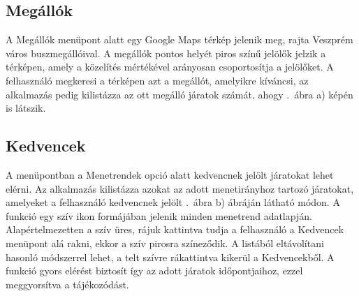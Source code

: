\subsection {Megállók}
\label {megallok}
A Megállók menüpont alatt egy Google Maps térkép jelenik meg, rajta Veszprém város buszmegállóival.
A megállók pontos helyét piros színű jelölők jelzik a térképen, amely a közelítés mértékével arányosan csoportosítja a jelölőket.
A felhasználó megkeresi a térképen azt a megállót, amelyikre kíváncsi, az alkalmazás pedig kilistázza az ott megálló járatok számát, ahogy .\ ábra a) képén is látszik.

\subsection {Kedvencek}
\label {kedvencek}
A menüpontban a Menetrendek opció alatt kedvencnek jelölt járatokat lehet elérni.
Az alkalmazás kilistázza azokat az adott menetirányhoz tartozó járatokat, amelyeket a felhasználó kedvencnek jelölt .\ ábra b) ábráján látható módon.
A funkció egy szív ikon formájában jelenik minden menetrend adatlapján.
Alapértelmezetten a szív üres, rájuk kattintva tudja a felhasználó a Kedvencek menüpont alá rakni, ekkor a szív pirosra színeződik.
A listából eltávolítani hasonló módszerrel lehet, a telt szívre rákattintva kikerül a Kedvencekből.
A funkció gyors elérést biztosít így az adott járatok időpontjaihoz, ezzel meggyorsítva a tájékozódást.

